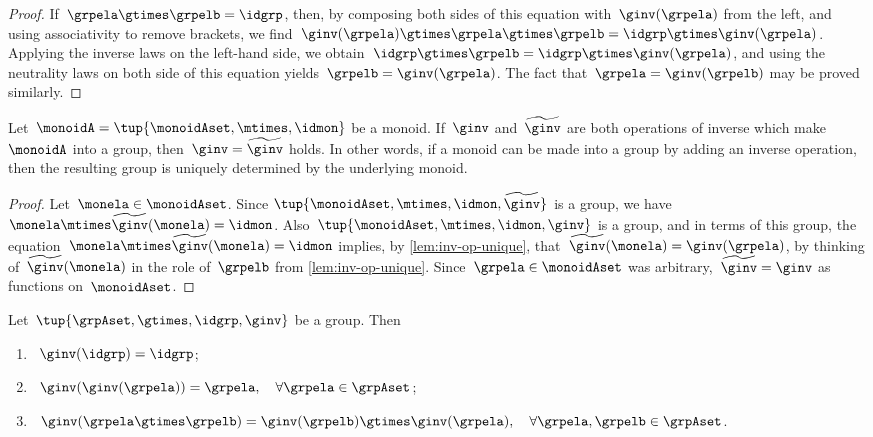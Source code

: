 \begin{proof}
    If~$\grpela \gtimes \grpelb = \idgrp$, then, by composing both sides of this equation with~$\ginv(\grpela)$ from the left, and using associativity to remove brackets, we find~$\ginv(\grpela) \gtimes \grpela \gtimes \grpelb = \idgrp \gtimes \ginv(\grpela)$.
    Applying the inverse laws on the left-hand side, we obtain~$\idgrp \gtimes \grpelb = \idgrp \gtimes \ginv(\grpela)$, and using the neutrality laws on both side of this equation yields~$\grpelb =  \ginv(\grpela)$.
    The fact that~$\grpela = \ginv(\grpelb)$ may be proved similarly.
\end{proof}


\begin{corollary}
    \label{cor:inv-op-unique}
    Let~$\monoidA = \tup{\monoidAset, \mtimes,  \idmon }$ be a monoid.
    If~$\ginv$ and~$\widetilde \ginv$ are both operations of inverse which make~$\monoidA$ into a group, then~$\ginv = \widetilde \ginv$ holds.
    In other words, if a monoid can be made into a group by adding an inverse operation, then the resulting group is uniquely determined by the underlying monoid.
\end{corollary}

\begin{proof}
    Let~$\monela \in \monoidAset$.
    Since $\tup{\monoidAset, \mtimes,  \idmon, \widetilde \ginv }$ is a group, we have~$\monela \mtimes  \widetilde \ginv(\monela) = \idmon$.
    Also~$\tup{\monoidAset, \mtimes,  \idmon, \ginv }$ is a group, and in terms of this group, the equation~$\monela \mtimes  \widetilde \ginv(\monela) = \idmon$ implies, by \cref{lem:inv-op-unique}, that~$\widetilde \ginv(\monela) = \ginv(\grpela)$, by thinking of~$\widetilde \ginv(\monela)$ in the role of~$\grpelb$ from \cref{lem:inv-op-unique}.
    Since~$\grpela \in \monoidAset$ was arbitrary,~$\widetilde \ginv = \ginv$ as functions on~$\monoidAset$.
\end{proof}


\begin{lemma}
    \label{lem:inv-op-properties}
    Let~$\tup{\grpAset, \gtimes, \idgrp, \ginv}$ be a group. Then
    \begin{enumerate}
        \item\label{eq:group-neutral-invariant}~$\ginv(\idgrp) = \idgrp$;
        \item\label{eq:group-inverse-inverse}~$ \ginv(\ginv(\grpela)) = \grpela, \quad \forall \grpela \in \grpAset$;
        \item\label{eq:group-inverse-of-composition}~$\ginv(\grpela \gtimes \grpelb ) = \ginv(\grpelb) \gtimes \ginv(\grpela), \quad \forall \grpela, \grpelb \in \grpAset$.
    \end{enumerate}
\end{lemma}


